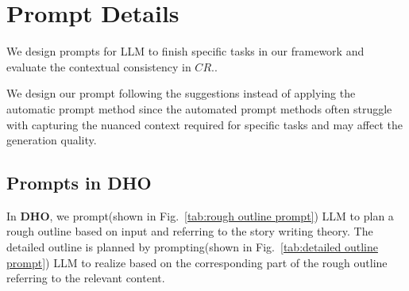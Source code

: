 
\section{Prompt Details}
\label{sep:prompt}
We design prompts for LLM to finish specific tasks in our framework and evaluate the contextual consistency in ${CR.}$. 

We design our prompt following the suggestions instead of applying the automatic prompt method since the automated prompt methods often struggle with capturing the nuanced context required for specific tasks \cite{si2023prompting} and may affect the generation quality.


\subsection{Prompts in DHO}
\label{sup:prompt dho}
In \textbf{DHO}, we prompt(shown in Fig.~\ref{tab:rough outline prompt}) LLM to plan a rough outline based on input and referring to the story writing theory. The detailed outline is planned by prompting(shown in Fig.~\ref{tab:detailed outline prompt}) LLM to realize based on the corresponding part of the rough outline referring to the relevant content.\par





